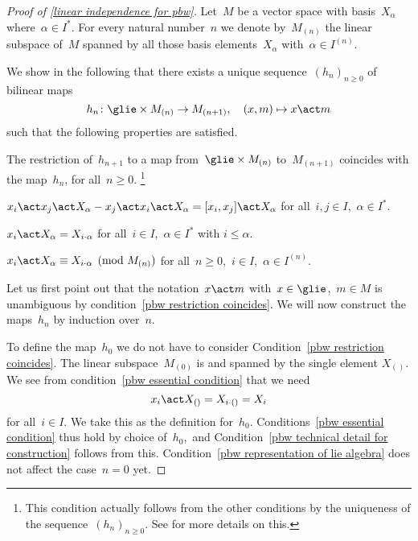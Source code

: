 \begin{proof}[Proof of \cref{linear independence for pbw}]
	Let~$M$ be a vector space with basis~$X_\alpha$ where~$\alpha \in I^*$.
	For every natural number~$n$ we denote by~$M_{(n)}$ the linear subspace of~$M$ spanned by all those basis elements~$X_\alpha$ with~$\alpha \in I^{(n)}$.

	We show in the following that there exists a unique sequence~$(h_n)_{n \geq 0}$ of bilinear maps
	\[
		h_n
		\colon
		\glie \times M_{(n)}
		\to
		M_{(n+1)},
		\quad
		(x, m)
		\mapsto
		x \act m
	\]
	such that the following properties are satisfied.
	\begin{enumerate*}
		\item
			\label{pbw restriction coincides}
			The restriction of~$h_{n+1}$ to a map from~$\glie \times M_{(n)}$ to~$M_{(n+1)}$ coincides with the map~$h_n$, for all~$n \geq 0$.%
			\footnote{
				This condition actually follows from the other conditions by the uniqueness of the sequence~$(h_n)_{n \geq 0}$.
				See \cite[\S 17.4]{humphreys} for more details on this.
			}
		\item
			\label{pbw representation of lie algebra}
			$x_i \act x_j \act X_\alpha - x_j \act x_i \act X_\alpha = [x_i, x_j] \act X_\alpha$ for all~$i,j \in I$,~$\alpha \in I^*$.
		\item
			\label{pbw essential condition}
			$x_i \act X_\alpha = X_{i \cdot \alpha}$ for all~$i \in I$,~$\alpha \in I^*$ with $i \leq \alpha$.
		\item
			\label{pbw technical detail for construction}
			$x_i \act X_\alpha \equiv X_{i \cdot \alpha} \pmod{M_{(n)}}$ for all~$n \geq 0$,~$i \in I$,~$\alpha \in I^{(n)}$.
	\end{enumerate*}

	Let us first point out that the notation~$x \act m$ with~$x \in \glie$,~$m \in M$ is unambiguous by condition~\ref{pbw restriction coincides}.
	We will now construct the maps~$h_n$ by induction over~$n$.
	
	To define the map~$h_0$ we do not have to consider Condition~\ref*{pbw restriction coincides}.
	The linear subspace~$M_{(0)}$ is {\onedimensional} and spanned by the single element $X_{()}$.
	We see from condition~\ref*{pbw essential condition} that we need
	\[
		x_i \act X_{()}
		=
		X_{i \cdot ()}
		=
		X_i
	\]
	for all~$i \in I$.
	We take this as the definition for~$h_0$.
	Conditions~\ref{pbw essential condition} thus hold by choice of~$h_0$,~and Condition~\ref{pbw technical detail for construction} follows from this.
	Condition~\ref{pbw representation of lie algebra} does not affect the case~$n = 0$ yet.


\end{proof}
